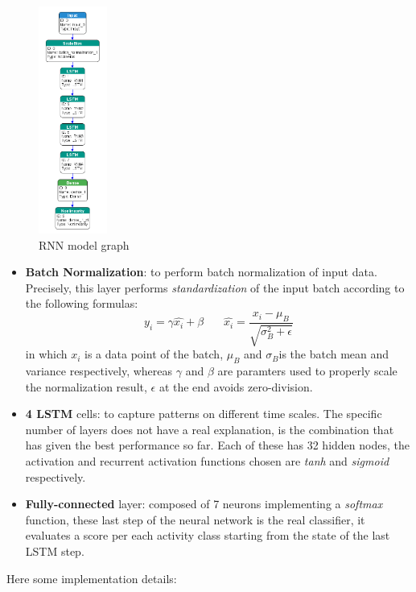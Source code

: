 \begin{figure}
	\hfill\includegraphics[width=0.2\textwidth]{figures/lstm_nn.png}\hspace*{\fill}
	\caption{RNN model graph}\label{fig:9}
	\centering
	\vspace{-90pt}
\end{figure}
\noindent
\begin{itemize}
	\item \textbf{Batch Normalization}: to perform batch normalization of input data. Precisely, this layer performs \textit{standardization} of the input batch according to the following formulas:
	\[
		 y_{i} = \gamma \hat{x_{i}} + \beta \ \ \ \ \ \ \ \ 
		 \hat{x_{i}} = \frac{x_{i} - \mu_{B}}{\sqrt{\sigma_{B}^2 + \epsilon}}
	\]
	in which $x_{i}$ is a data point of the batch, $ \mu_{B} $ and $ \sigma_{B} $is the batch mean and variance respectively, whereas $ \gamma $ and $ \beta $ are paramters used to properly scale the normalization result, $ \epsilon $ at the end avoids zero-division. 
	\item \textbf{4 LSTM} cells: to capture patterns on different time scales. The specific number of layers does not have a real explanation, is the combination that has given the best performance so far. Each of these has 32 hidden nodes, the activation and recurrent activation functions chosen are \textit{tanh} and \textit{sigmoid} respectively. 
	\item \textbf{Fully-connected} layer: composed of 7 neurons implementing a \textit{softmax} function, these last step of the neural network is the real classifier, it evaluates a score per each activity class starting from the state of the last LSTM step. 
\end{itemize}
Here some implementation details:



